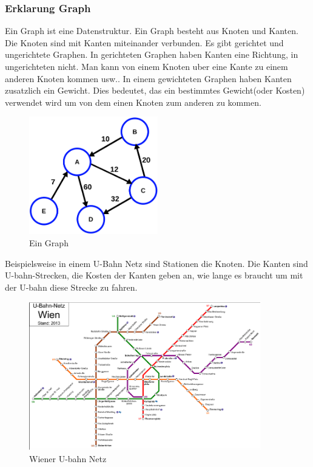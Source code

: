 \documentclass[a4paper,12pt,arial]{scrartcl}
\begin{document}
\subsubsection{Erklarung Graph}
Ein Graph ist eine Datenstruktur.
Ein Graph besteht aus Knoten und Kanten.
Die Knoten sind mit Kanten miteinander verbunden.
Es gibt gerichtet und ungerichtete Graphen.
In gerichteten Graphen haben Kanten eine Richtung, in ungerichteten nicht.
Man kann von einem Knoten uber eine Kante zu einem anderen Knoten kommen usw..
In einem gewichteten Graphen haben Kanten zusatzlich ein Gewicht. Dies bedeutet, das ein bestimmtes Gewicht(oder Kosten) verwendet wird um von dem einen Knoten zum anderen zu kommen.
\begin{figure}[h]
    \centering
    \includegraphics[width=0.5\textwidth]{graph.pdf}
    \caption{Ein Graph \textcite{wikipediaGraph}}
    \label{fig:graph}
\end{figure}

Beispielsweise in einem U-Bahn Netz sind Stationen die Knoten. Die Kanten sind U-bahn-Strecken, die Kosten der Kanten geben an, wie lange es braucht um mit der U-bahn diese Strecke zu fahren.
\begin{figure}[h]
    \centering
    \includegraphics[width=0.9\textwidth]{u-bahn.pdf}
    \caption{Wiener U-bahn Netz \textcite{wikipediaUbahn}}
    \label{fig:u-bahn-netz}
\end{figure}
\end{document}
